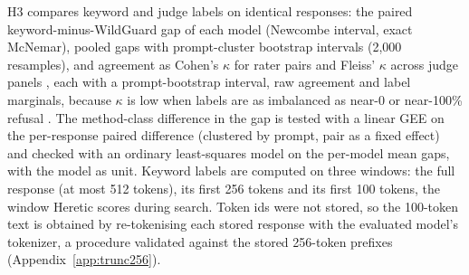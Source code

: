 H3 compares keyword and judge labels on identical responses: the paired
keyword-minus-WildGuard gap of each model (Newcombe interval, exact McNemar),
pooled gaps with prompt-cluster bootstrap intervals (2,000 resamples), and
agreement as Cohen's $\kappa$ for rater pairs \cite{cohen1960coefficient} and
Fleiss' $\kappa$ across judge panels \cite{fleiss1971measuring}, each with a
prompt-bootstrap interval, raw agreement and label marginals, because $\kappa$
is low when labels are as imbalanced as near-0 or near-100\% refusal
\cite{feinstein1990high}. The method-class difference in the gap is tested
with a linear GEE on the per-response paired difference (clustered by prompt,
pair as a fixed effect) and checked with an ordinary least-squares model on
the per-model mean gaps, with the model as unit. Keyword labels are computed
on three windows: the full response (at most 512 tokens), its first 256 tokens
and its first 100 tokens, the window Heretic scores during search. Token ids
were not stored, so the 100-token text is obtained by re-tokenising each
stored response with the evaluated model's tokenizer, a procedure validated
against the stored 256-token prefixes (Appendix~\ref{app:trunc256}).

